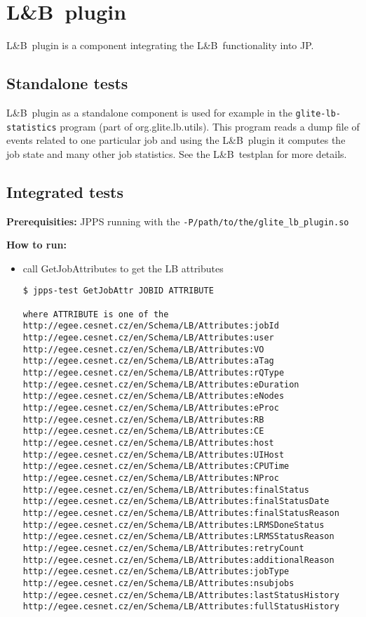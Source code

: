 \documentclass{egee}
\def\LB{L\&B}
\def\req{\noindent\textbf{Prerequisities: }}
\def\how{\noindent\textbf{How to run: }}
\def\todo#1{\textbf{TODO:} #1}
\begin{document}
\section{\LB\ plugin}
\LB\ plugin is a component integrating the \LB\ functionality into JP.


\subsection{Standalone tests}
\LB\ plugin as a standalone component is used for example in the \texttt{glite-lb-statistics} 
program (part of org.glite.lb.utils). This program reads a dump file of events related to
one particular job and using the \LB\ plugin it computes the job state and many other job 
statistics. See the \LB\ testplan for more details.

\subsection{Integrated tests}
\req JPPS running with the \texttt{-P/path/to/the/glite\_lb\_plugin.so}

\how 
\begin{itemize}
\item call GetJobAttributes to get the LB attributes
\begin{verbatim}
$ jpps-test GetJobAttr JOBID ATTRIBUTE

where ATTRIBUTE is one of the 
http://egee.cesnet.cz/en/Schema/LB/Attributes:jobId
http://egee.cesnet.cz/en/Schema/LB/Attributes:user
http://egee.cesnet.cz/en/Schema/LB/Attributes:VO
http://egee.cesnet.cz/en/Schema/LB/Attributes:aTag
http://egee.cesnet.cz/en/Schema/LB/Attributes:rQType
http://egee.cesnet.cz/en/Schema/LB/Attributes:eDuration
http://egee.cesnet.cz/en/Schema/LB/Attributes:eNodes
http://egee.cesnet.cz/en/Schema/LB/Attributes:eProc
http://egee.cesnet.cz/en/Schema/LB/Attributes:RB
http://egee.cesnet.cz/en/Schema/LB/Attributes:CE
http://egee.cesnet.cz/en/Schema/LB/Attributes:host
http://egee.cesnet.cz/en/Schema/LB/Attributes:UIHost
http://egee.cesnet.cz/en/Schema/LB/Attributes:CPUTime
http://egee.cesnet.cz/en/Schema/LB/Attributes:NProc
http://egee.cesnet.cz/en/Schema/LB/Attributes:finalStatus
http://egee.cesnet.cz/en/Schema/LB/Attributes:finalStatusDate
http://egee.cesnet.cz/en/Schema/LB/Attributes:finalStatusReason
http://egee.cesnet.cz/en/Schema/LB/Attributes:LRMSDoneStatus
http://egee.cesnet.cz/en/Schema/LB/Attributes:LRMSStatusReason
http://egee.cesnet.cz/en/Schema/LB/Attributes:retryCount
http://egee.cesnet.cz/en/Schema/LB/Attributes:additionalReason
http://egee.cesnet.cz/en/Schema/LB/Attributes:jobType
http://egee.cesnet.cz/en/Schema/LB/Attributes:nsubjobs
http://egee.cesnet.cz/en/Schema/LB/Attributes:lastStatusHistory
http://egee.cesnet.cz/en/Schema/LB/Attributes:fullStatusHistory
\end{verbatim}
\end{itemize}
\end{document}
